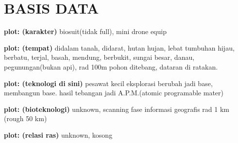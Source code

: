 \chapter{BASIS DATA}

\textbf{plot: (karakter)} biosuit(tidak full), mini drone equip

\textbf{plot: (tempat)} didalam tanah, didarat, hutan hujan, lebat tumbuhan hijau, berbatu, terjal, basah, mendung, berbukit, sungai besar, danau, pegunungan(bukan api), rad 100m pohon ditebang, dataran di ratakan.

\textbf{plot: (teknologi di sini)} pesawat kecil eksplorasi berubah jadi base, membangun base. hasil tebangan jadi A.P.M.(atomic programable mater)

\textbf{plot: (bioteknologi)} unknown, scanning fase informasi geografis rad 1 km (rough 50 km)

\textbf{plot: (relasi ras)} unknown, kosong


